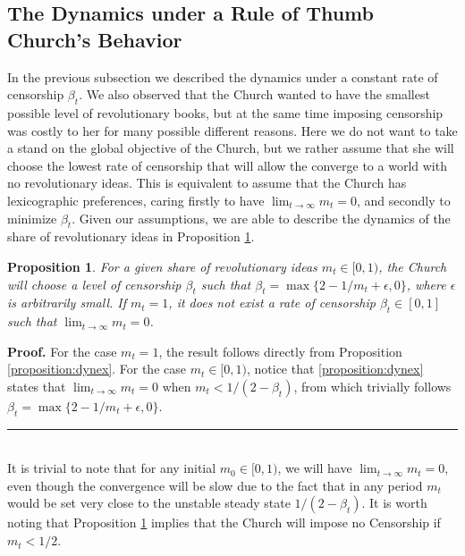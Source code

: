 \documentclass[12pt]{article}
\newtheorem{proposition}{Proposition}
\newenvironment{proof}[1][Proof]{\noindent \textbf{#1.} }{\  \rule{0.5em}{0.5em}}
\begin{document}
\subsection{The Dynamics under a Rule of Thumb Church's Behavior}
In the previous subsection we described the dynamics under a constant rate of censorship $\beta_t$. We also observed that the Church wanted to have the smallest possible level of revolutionary books, but at the same time imposing censorship was costly to her for many possible different reasons. Here we do not want to take a stand on the global objective of the Church, but we rather assume that she will choose the lowest rate of censorship that will allow the converge to a world with no revolutionary ideas. This is equivalent to assume that the Church has lexicographic preferences, caring firstly to have $\lim_{t\to\infty}m_t=0$, and secondly to minimize $\beta_t$. Given our assumptions, we are able to describe the dynamics of the share of revolutionary ideas in Proposition \ref{proposition:rthumb}.
\begin{proposition}
	For a given share of revolutionary ideas $m_t \in [0,1)$, the Church will choose a level of censorship $\beta_t$ such that $\beta_t=\max\{2-1/m_t+\epsilon,0\}$, where $\epsilon$ is arbitrarily small. If $m_t=1$, it does not exist a rate of censorship $\beta_t \in [0,1]$ such that $\lim_{t\to\infty}m_t=0$.
	\label{proposition:rthumb}
\end{proposition}
\begin{proof}
For the case $m_t=1$, the result follows directly from Proposition \ref{proposition:dynex}. For the case $m_t \in [0,1)$, notice that \ref{proposition:dynex} states that $\lim_{t\to\infty}m_t=0$ when $m_t<1/(2-\beta_t)$, from which trivially follows  $\beta_t=\max\{2-1/m_t+\epsilon,0\}$.
\end{proof}
\newline\\
It is trivial to note that for any initial $m_0 \in [0,1)$, we will have $\lim_{t\to\infty}m_t=0$, even though the convergence will be slow due to the fact that in any period $m_t$ would be set very close to the unstable steady state $1/(2-\beta_t)$. It is worth noting that Proposition \ref{proposition:rthumb} implies that the Church will impose no Censorship if $m_t<1/2$.
\end{document}
